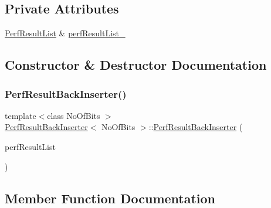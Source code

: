 \subsection*{Private Attributes}
\begin{DoxyCompactItemize}
\item 
\mbox{\hyperlink{_performance_8cpp_a6182ff5fcd4814adbff677bd44fd6ae4}{Perf\+Result\+List}} \& \mbox{\hyperlink{struct_perf_result_back_inserter_a035abca4f18f19dda3bb17ef74a75b72}{perf\+Result\+List\+\_\+}}
\end{DoxyCompactItemize}


\subsection{Constructor \& Destructor Documentation}
\mbox{\label{struct_perf_result_back_inserter_a1b52c688257516683577fd1b6edec0f1}} 
\subsubsection{\texorpdfstring{Perf\+Result\+Back\+Inserter()}{PerfResultBackInserter()}}
{\footnotesize\ttfamily template$<$class No\+Of\+Bits $>$ \\
\mbox{\hyperlink{struct_perf_result_back_inserter}{Perf\+Result\+Back\+Inserter}}$<$ No\+Of\+Bits $>$\+::\mbox{\hyperlink{struct_perf_result_back_inserter}{Perf\+Result\+Back\+Inserter}} (\begin{DoxyParamCaption}\item[{\mbox{\hyperlink{_performance_8cpp_a6182ff5fcd4814adbff677bd44fd6ae4}{Perf\+Result\+List}} \&}]{perf\+Result\+List }\end{DoxyParamCaption})\hspace{0.3cm}{\ttfamily [inline]}}



\subsection{Member Function Documentation}
\mbox{\label{struct_perf_result_back_inserter_a14981b64815b35c77f99c7db5ac4db15}} 
